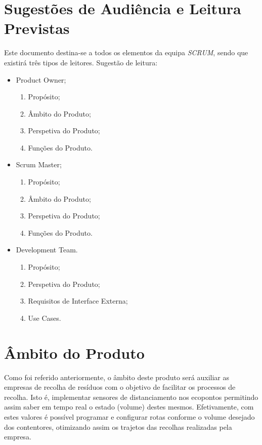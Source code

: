 \documentclass{scrreprt}
\begin{document}
	\section{Sugestões de Audiência e Leitura Previstas}
	Este documento destina-se a todos os elementos da equipa \textit{SCRUM},
	sendo que existirá três tipos de leitores.
	Sugestão de leitura:
	\begin{itemize}
		\item Product Owner;
		\begin{enumerate}
			\item Propósito;
			\item Âmbito do Produto;
			\item Perspetiva do Produto;
			\item Funções do Produto.
		\end{enumerate}
		\item Scrum Master;
		\begin{enumerate}
			\item Propósito;
			\item Âmbito do Produto;
			\item Perspetiva do Produto;
			\item Funções do Produto.
		\end{enumerate}
		\item Development Team.
		\begin{enumerate}
			\item Propósito;
			\item Perspetiva do Produto;
			\item Requisitos de Interface Externa;
			\item Use Cases.
		\end{enumerate}
	\end{itemize}
	
	
	
	\section{Âmbito do Produto}
	Como foi referido anteriormente, o âmbito deste produto será auxiliar as empresas de recolha de resíduos com o objetivo de facilitar os processos de recolha. Isto é, implementar sensores de distanciamento nos ecopontos permitindo assim saber em tempo real o estado (volume) destes mesmos. Efetivamente, com estes valores é possível programar e configurar rotas conforme o volume desejado dos contentores, otimizando assim os trajetos das recolhas realizadas pela empresa. 
\end{document}
